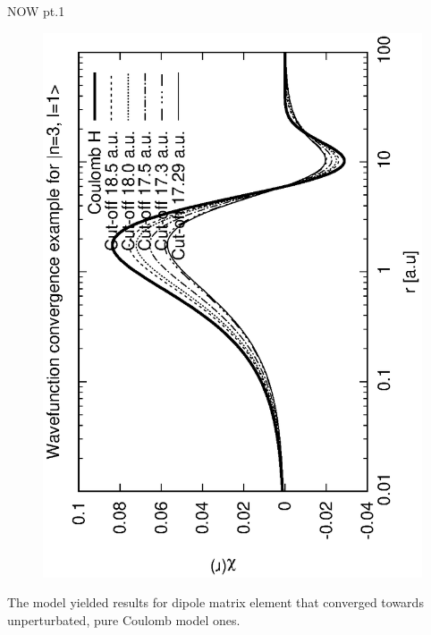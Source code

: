 \documentclass{beamer}
\begin{document}
\begin{frame}{NOW pt.1}
\begin{figure}
        \includegraphics[scale=0.32,angle=-90]{fig/psi_n_3_l_1.eps}
    \end{figure}

    The model yielded results for dipole matrix element that converged towards unperturbated, pure Coulomb model ones.
\end{frame}
\end{document}
